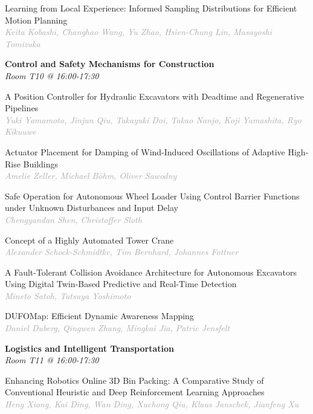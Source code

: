\begin{multicols*}{2}
\small Learning from Local Experience: Informed Sampling Distributions for Efficient Motion Planning\\ 
\footnotesize \textcolor{darkgray}{\textit{Keita Kobashi, Changhao  Wang, Yu  Zhao, Hsien-Chung  Lin, Masayoshi  Tomizuka}}

\normalsize \textbf{Control and Safety Mechanisms for Construction}\\
\small \textit{Room T10 @ 16:00-17:30}

\small A Position Controller for Hydraulic Excavators with Deadtime and Regenerative Pipelines\\ 
\footnotesize \textcolor{darkgray}{\textit{Yuki Yamamoto, Jinjun  Qiu, Takayuki  Doi, Takao  Nanjo, Koji  Yamashita, Ryo  Kikuuwe}}

\small Actuator Placement for Damping of Wind-Induced Oscillations of Adaptive High-Rise Buildings\\ 
\footnotesize \textcolor{darkgray}{\textit{Amelie Zeller, Michael  Böhm, Oliver  Sawodny}}

\small Safe Operation for Autonomous Wheel Loader Using Control Barrier Functions under Unknown Disturbances and Input Delay\\ 
\footnotesize \textcolor{darkgray}{\textit{Chengyandan Shen, Christoffer  Sloth}}

\small Concept of a Highly Automated Tower Crane\\ 
\footnotesize \textcolor{darkgray}{\textit{Alexander Schock-Schmidtke, Tim  Bernhard, Johannes  Fottner}}

\small A Fault-Tolerant Collision Avoidance Architecture for Autonomous Excavators Using Digital Twin-Based Predictive and Real-Time Detection\\ 
\footnotesize \textcolor{darkgray}{\textit{Mineto Satoh, Tatsuya  Yoshimoto}}

\small DUFOMap: Efficient Dynamic Awareness Mapping\\ 
\footnotesize \textcolor{darkgray}{\textit{Daniel Duberg, Qingwen  Zhang, Mingkai  Jia, Patric  Jensfelt}}

\normalsize \textbf{Logistics and Intelligent Transportation}\\
\small \textit{Room T11 @ 16:00-17:30}

\small Enhancing Robotics Online 3D Bin Packing: A Comparative Study of Conventional Heuristic and Deep Reinforcement Learning Approaches\\ 
\footnotesize \textcolor{darkgray}{\textit{Heng Xiong, Kai  Ding, Wan  Ding, Xuchong  Qiu, Klaus  Janschek, Jianfeng  Xu}}


\end{multicols*}
